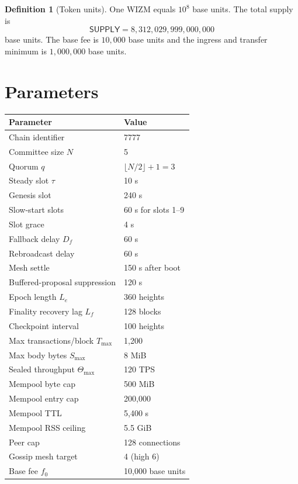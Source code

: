 \documentclass[11pt,a4paper]{article}
\theoremstyle{definition}
\newtheorem{definition}{Definition}[section]
\theoremstyle{plain}
\begin{document}
\begin{definition}[Token units]
One WIZM equals $10^8$ base units. The total supply is
\[
  \mathsf{SUPPLY}=8{,}312{,}029{,}999{,}000{,}000
\]
base units. The base fee is $10{,}000$ base units and the ingress and transfer
minimum is $1{,}000{,}000$ base units.
\end{definition}

\section{Parameters}

\begin{center}
\begin{longtable}{@{}p{}p{}@{}}
\toprule
Parameter & Value \\
\midrule
Chain identifier & 7777 \\
Committee size $N$ & 5 \\
Quorum $q$ & $\lfloor N/2\rfloor+1=3$ \\
Steady slot $\tau$ & 10 s \\
Genesis slot & 240 s \\
Slow-start slots & 60 s for slots 1--9 \\
Slot grace & 4 s \\
Fallback delay $D_f$ & 60 s \\
Rebroadcast delay & 60 s \\
Mesh settle & 150 s after boot \\
Buffered-proposal suppression & 120 s \\
Epoch length $L_e$ & 360 heights \\
Finality recovery lag $L_f$ & 128 blocks \\
Checkpoint interval & 100 heights \\
Max transactions/block $T_{\max}$ & 1,200 \\
Max body bytes $S_{\max}$ & 8 MiB \\
Sealed throughput $\Theta_{\max}$ & 120 TPS \\
Mempool byte cap & 500 MiB \\
Mempool entry cap & 200,000 \\
Mempool TTL & 5,400 s \\
Mempool RSS ceiling & 5.5 GiB \\
Peer cap & 128 connections \\
Gossip mesh target & 4 (high 6) \\
Base fee $f_0$ & 10,000 base units \\

\end{longtable}
\end{center}
\end{document}
